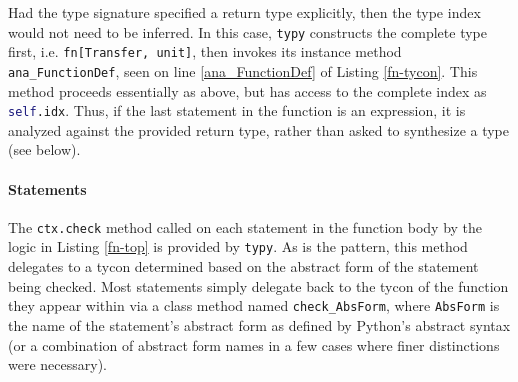 \documentclass[preprint,10pt]{sigplanconf}
\newcommand{\lip}[1]{\lstinline[language=Python,basicstyle=\ttfamily\small,deletendkeywords={tuple,buffer,map}]{#1}}
\begin{document}
Had the type signature specified a return type explicitly, then the type index would not need to be inferred. In this case, \lip{typy} constructs the complete type first, i.e. \lip{fn[Transfer, unit]}, then invokes its instance method \lip{ana_FunctionDef}, seen on line \ref{ana_FunctionDef} of Listing \ref{fn-tycon}. This method proceeds essentially as above, but has access to the complete index as \lip{self.idx}. Thus, if the last statement in the function is an expression, it is analyzed against the provided return type, rather than asked to synthesize a type (see below). %


\paragraph{Statements}
The \lip{ctx.check} method called on each statement in the function body by the logic in  Listing \ref{fn-top} is provided by \verb|typy|. As is the pattern, this method delegates to a tycon determined based on the abstract form of the statement being checked. Most statements simply delegate back to the tycon of the function they appear within via a class method named \lip{check_AbsForm}, where \lip{AbsForm} is the name of the statement's abstract form as defined by Python's abstract syntax (or a combination of abstract form names in a few cases where finer distinctions  were necessary).
\end{document}
